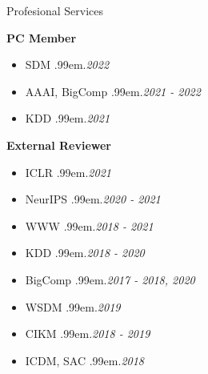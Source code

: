\documentclass{resume} %
\makeatletter
\newcommand \Dotfill {\leavevmode \cleaders \hb@xt@ .99em{\hss .\hss }\hfill \kern \z@}
\makeatother
\begin{document}
\begin{rSection}{Profesional Services}


\textbf{PC Member}
\begin{itemize}[noitemsep]
	\item SDM \smallskip \Dotfill \emph{2022}
	\item AAAI, BigComp \smallskip \Dotfill \emph{2021 - 2022}
	\item KDD \smallskip \Dotfill \emph{2021}
\end{itemize}

\textbf{External Reviewer}
\begin{itemize}[noitemsep]
	\item ICLR \smallskip \Dotfill \emph{2021} \\
	\item NeurIPS \smallskip \Dotfill \emph{2020 - 2021} \\
	\item WWW \smallskip \Dotfill \emph{2018 - 2021} \\
	\item KDD \smallskip \Dotfill \emph{2018 - 2020} \\
	\item BigComp \smallskip \Dotfill \emph{2017 - 2018, 2020} \\
	\item WSDM \smallskip \Dotfill \emph{2019} \\
	\item CIKM \smallskip \Dotfill \emph{2018 - 2019} \\
	\item ICDM, SAC \smallskip \Dotfill \emph{2018} \\
\end{itemize}

\end{rSection}


\begin{comment}
\begin{rSection}{Experience}

\textbf{Infosys Limited} \hfill Bengaluru, India \\ 
\emph{Student Intern} \hfill \emph{Jun. 2015 - Jul. 2015}

\textbf{SK Hynix} \hfill Incheon, South Korea \\ 
\emph{Student Intern} \hfill \emph{Dec. 2014 - Jan. 2015}

\textbf{KISTI} \hfill Daejeon, South Korea \\ 
\emph{Student Intern} \hfill \emph{Jan. 2014 - Feb. 2014}

\end{rSection}
\end{comment}
\end{document}
